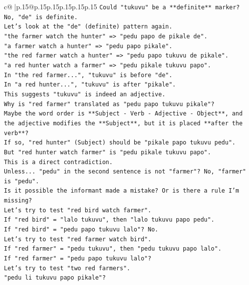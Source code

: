 \documentclass{article}
\begin{document}
{\begin{supertabular}{c@{$\;$}|p{.15\linewidth}@{}p{.15\linewidth}p{.15\linewidth}p{.15\linewidth}p{.15\linewidth}p{.15\linewidth}}
{{{\texttt{Could "tukuvu" be a **definite** marker? No, "de" is definite.} \\
\texttt{Let's look at the "de" (definite) pattern again.} \\
\texttt{"the farmer watch the hunter" => "pedu papo de pikale de".} \\
\texttt{"a farmer watch a hunter" => "pedu papo pikale".} \\
\texttt{"the red farmer watch a hunter" => "pedu papo tukuvu de pikale".} \\
\texttt{"a red hunter watch a farmer" => "pedu pikale tukuvu papo".} \\
\texttt{In "the red farmer...", "tukuvu" is before "de".} \\
\texttt{In "a red hunter...", "tukuvu" is after "pikale".} \\
\texttt{This suggests "tukuvu" is indeed an adjective.} \\
\texttt{Why is "red farmer" translated as "pedu papo tukuvu pikale"?} \\
\texttt{Maybe the word order is **Subject {-} Verb {-} Adjective {-} Object**, and the adjective modifies the **Subject**, but it is placed **after the verb**?} \\
\texttt{If so, "red hunter" (Subject) should be "pikale papo tukuvu pedu".} \\
\texttt{But "red hunter watch farmer" is "pedu pikale tukuvu papo".} \\
\texttt{This is a direct contradiction.} \\
\texttt{Unless... "pedu" in the second sentence is not "farmer"? No, "farmer" is "pedu".} \\
\texttt{Is it possible the informant made a mistake? Or is there a rule I'm missing?} \\
\texttt{Let's try to test "red bird watch farmer".} \\
\texttt{If "red bird" = "lalo tukuvu", then "lalo tukuvu papo pedu".} \\
\texttt{If "red bird" = "pedu papo tukuvu lalo"? No.} \\
\texttt{Let's try to test "red farmer watch bird".} \\
\texttt{If "red farmer" = "pedu tukuvu", then "pedu tukuvu papo lalo".} \\
\texttt{If "red farmer" = "pedu papo tukuvu lalo"?} \\
\texttt{Let's try to test "two red farmers".} \\
\texttt{"pedu li tukuvu papo pikale"?} \\
}}}
\end{supertabular}}
\end{document}
